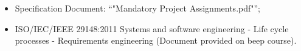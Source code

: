 \begin{itemize}
\item Specification Document: “"Mandatory Project Assignments.pdf"”;
\item ISO/IEC/IEEE 29148:2011 Systems and software engineering - Life cycle
processes - Requirements engineering (Document provided on beep course).
\end{itemize}
